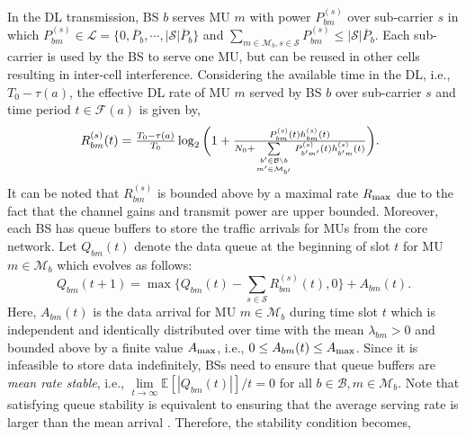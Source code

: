 \documentclass[conference]{IEEEtran}
\newcommand{\totalpower}[1]{%
	\overline{P}_{#1}%
}
\begin{document}
In the DL transmission, BS $b$ serves MU $m$ with power $P^{(s)}_{bm}$ over sub-carrier $s$ in which $P^{(s)}_{bm}\in\mathcal{L}=\{0,\totalpower{b},\cdots,|\mathcal{S}|\totalpower{b}\}$ and  $\sum_{m\in\mathcal{M}_b,s\in\mathcal{S}} P_{bm}^{(s)}\leq |\mathcal{S}|\totalpower{b}$. Each sub-carrier is used by the BS to serve one MU, but can be reused in other cells resulting in inter-cell interference. Considering the available time in the DL, i.e., $T_0-\tau(a)$, the effective DL rate of MU $m$ served by BS $b$ over sub-carrier $s$ and time period $t\in\mathcal{F}(a)$ is given by,
%
%
%
\begin{multline}
\hspace{-0.9em}\textstyle R_{bm}^{(s)}(t)  =  \frac{T_0-\tau(a)}{T_0}
 \log_2\bigg(1  + \frac{P_{bm}^{(s)}(t)h_{bm}^{(s)}(t)}{N_0+\sum\limits_{b'\in\mathcal{B}\setminus b \atop m'\in\mathcal{M}_{b'}}P_{b'm'}^{(s)} (t) h_{b'm}^{(s)}(t)} \bigg).\label{Eq: DL instantaneous rate}\!\!
\end{multline}
%
%
%
It can be noted that $R_{bm}^{(s)}$ is bounded above by a maximal rate $R_{\rm max}$ due to the fact that the channel gains and transmit power are upper bounded. Moreover, each BS has queue buffers to store the traffic arrivals for MUs from the core network.  Let $Q_{bm}(t)$ denote the data queue at the beginning of slot $t$  for MU $m\in\mathcal{M}_b$ which  evolves as follows:
%
%
%
\begin{equation}
%
\textstyle Q_{bm}(t+1)=\max\Big\{Q_{bm}(t) - \sum\limits_{s\in\mathcal{S}}R_{bm}^{(s)}(t),0\Big\}+A_{bm}(t).\label{Eq: Queue-Q}
%
\end{equation}
%
%
%
Here, $A_{bm}(t)$ is the data arrival for MU $m\in\mathcal{M}_b$ during time slot $t$ which is independent and identically distributed over time with the mean $\lambda_{bm}>0$ and bounded above by a finite value $A_{{\rm max}}$, i.e., $0\leq A_{bm}(t)\leq A_{{\rm max}}$.
Since it is infeasible to store data indefinitely, BSs need to ensure that queue buffers are \emph{mean rate stable}, i.e., {$\lim\limits_{t\to\infty}{\mathbb{E}\left[|Q_{bm}(t)|\right]}/{t}= 0$} for all $b\in\mathcal{B},m\in\mathcal{M}_b$.
%
%
%
%
%
%
%
Note that satisfying queue stability is equivalent to ensuring that the average serving rate is larger than the mean arrival \cite{Neely/Stochastic}. Therefore, the stability condition becomes,
\end{document}
